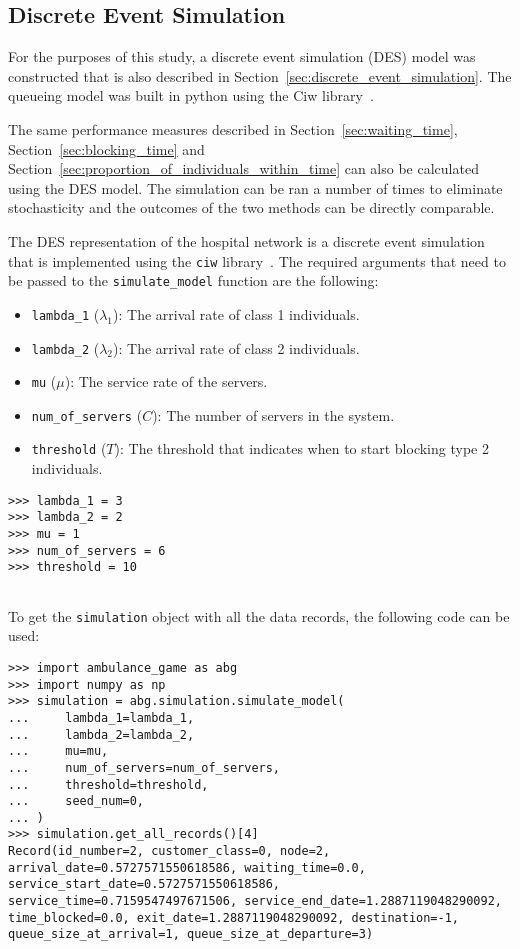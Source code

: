 \subsection{Discrete Event Simulation}

For the purposes of this study, a discrete event simulation (DES) model was
constructed that is also described in
Section~\ref{sec:discrete_event_simulation}.
The queueing model was built in python using the Ciw
library~\cite{ciwpython}.

The same performance measures described in Section~\ref{sec:waiting_time},
Section~\ref{sec:blocking_time} and
Section~\ref{sec:proportion_of_individuals_within_time} can also be
calculated using the DES model.
The simulation can be ran a number of times to eliminate stochasticity and the
outcomes of the two methods can be directly comparable.

The DES representation of the hospital network is a discrete event simulation
that is implemented using the \texttt{ciw} library~\cite{ciwpython}.
The required arguments that need to be passed to the
\texttt{simulate\_model} function are the following:

\begin{itemize}
    \item \texttt{lambda\_1} (\(\lambda_1\)): The arrival rate of class 1
    individuals.
    \item \texttt{lambda\_2} (\(\lambda_2\)): The arrival rate of class 2
    individuals.
    \item \texttt{mu} (\(\mu\)): The service rate of the servers.
    \item \texttt{num\_of\_servers} (\(C\)): The number of servers in the
    system.
    \item \texttt{threshold} (\(T\)): The threshold that indicates when to start
    blocking type 2 individuals.
\end{itemize}

\begin{lstlisting}[style=pystyle]
>>> lambda_1 = 3
>>> lambda_2 = 2
>>> mu = 1
>>> num_of_servers = 6
>>> threshold = 10
    
\end{lstlisting}

To get the \texttt{simulation} object with all the data records, the following
code can be used:

\begin{lstlisting}[style=pystyle]
>>> import ambulance_game as abg
>>> import numpy as np
>>> simulation = abg.simulation.simulate_model(
...     lambda_1=lambda_1,
...     lambda_2=lambda_2,
...     mu=mu,
...     num_of_servers=num_of_servers,
...     threshold=threshold,
...     seed_num=0,
... )
>>> simulation.get_all_records()[4]
Record(id_number=2, customer_class=0, node=2, arrival_date=0.5727571550618586, waiting_time=0.0, service_start_date=0.5727571550618586, service_time=0.7159547497671506, service_end_date=1.2887119048290092, time_blocked=0.0, exit_date=1.2887119048290092, destination=-1, queue_size_at_arrival=1, queue_size_at_departure=3)

\end{lstlisting}

